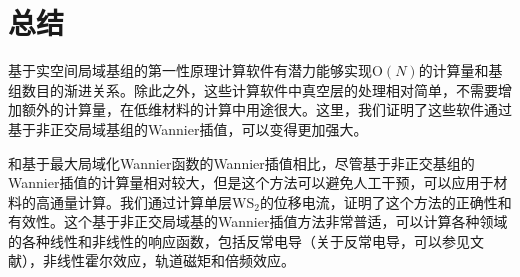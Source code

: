 \section{总结}

基于实空间局域基组的第一性原理计算软件有潜力能够实现$\text{O}(N)$的计算量和基组数目的渐进关系。除此之外，这些计算软件中真空层的处理相对简单，不需要增加额外的计算量，在低维材料的计算中用途很大。这里，我们证明了这些软件通过基于非正交局域基组的Wannier插值，可以变得更加强大。

和基于最大局域化Wannier函数的Wannier插值相比，尽管基于非正交基组的Wannier插值的计算量相对较大，但是这个方法可以避免人工干预，可以应用于材料的高通量计算。我们通过计算单层WS$_2$的位移电流，证明了这个方法的正确性和有效性。这个基于非正交局域基的Wannier插值方法非常普适，可以计算各种领域的各种线性和非线性的响应函数\cite{tokura_nonreciprocal_2018}，包括反常电导（关于反常电导，可以参见文献），非线性霍尔效应，轨道磁矩和倍频效应。

